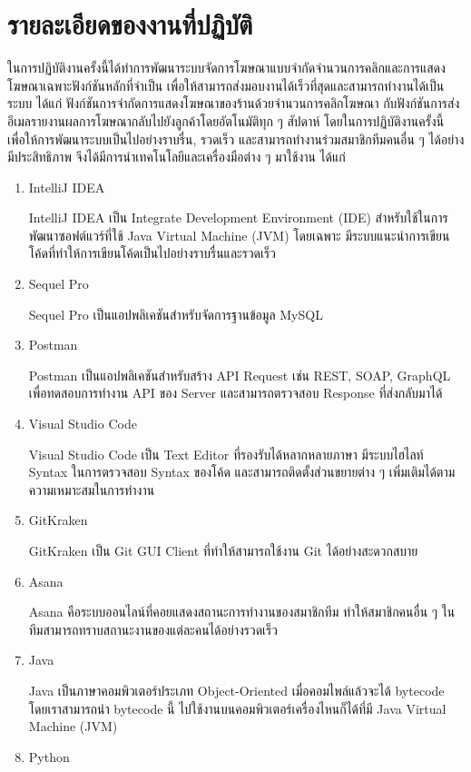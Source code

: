 \section{รายละเอียดของงานที่ปฏิบัติ}
ในการปฏิบัติงานครั้งนี้ได้ทำการพัฒนาระบบจัดการโฆษณาแบบจำกัดจำนวนการคลิกและการแสดงโฆษณาเฉพาะฟังก์ชันหลักที่จำเป็น เพื่อให้สามารถส่งมอบงานได้เร็วที่สุดและสามารถทำงานได้เป็นระบบ ได้แก่ ฟังก์ชันการจำกัดการแสดงโฆษณาของร้านด้วยจำนวนการคลิกโฆษณา กับฟังก์ชันการส่งอีเมลรายงานผลการโฆษณากลับไปยังลูกค้าโดยอัตโนมัติทุก ๆ สัปดาห์ โดยในการปฏิบัติงานครั้งนี้ เพื่อให้การพัฒนาระบบเป็นไปอย่างราบรื่น, รวดเร็ว และสามารถทำงานร่วมสมาชิกทีมคนอื่น ๆ ได้อย่างมีประสิทธิภาพ จึงได้มีการนำเทคโนโลยีและเครื่องมือต่าง ๆ มาใช้งาน ได้แก่
\begin{enumerate}
	\item IntelliJ IDEA
	
	IntelliJ IDEA เป็น Integrate Development Environment (IDE) สำหรับใช้ในการพัฒนาซอฟต์แวร์ที่ใช้ Java Virtual Machine (JVM) โดยเฉพาะ มีระบบแนะนำการเขียนโค้ดที่ทำให้การเขียนโค้ดเป็นไปอย่างราบรื่นและรวดเร็ว ~\cite{intellij}
	\item Sequel Pro
	
	Sequel Pro เป็นแอปพลิเคชันสำหรับจัดการฐานข้อมูล MySQL ~\cite{sequelpro}
	\item Postman
	
	Postman เป็นแอปพลิเคชันสำหรับสร้าง API Request เช่น REST, SOAP, GraphQL เพื่อทดสอบการทำงาน API ของ Server และสามารถตรวจสอบ Response ที่ส่งกลับมาได้ ~\cite{postman}
	\item Visual Studio Code
	
	Visual Studio Code เป็น Text Editor ที่รองรับได้หลากหลายภาษา มีระบบไฮไลท์ Syntax ในการตรวจสอบ Syntax ของโค้ด และสามารถติดตั้งส่วนขยายต่าง ๆ เพิ่มเติมได้ตามความเหมาะสมในการทำงาน ~\cite{vscode}
	\item GitKraken
	
	GitKraken เป็น Git GUI Client ที่ทำให้สามารถใช้งาน Git ได้อย่างสะดวกสบาย ~\cite{gitkraken}
	\item Asana
	
	Asana คือระบบออนไลน์ที่คอยแสดงสถานะการทำงานของสมาชิกทีม ทำให้สมาชิกคนอื่น ๆ ในทีมสามารถทราบสถานะงานของแต่ละคนได้อย่างรวดเร็ว ~\cite{asana}
	\item Java
	
	Java เป็นภาษาคอมพิวเตอร์ประเภท Object-Oriented เมื่อคอมไพล์แล้วจะได้ bytecode โดยเราสามารถนำ bytecode นี้ ไปใช้งานบนคอมพิวเตอร์เครื่องไหนก็ได้ที่มี Java Virtual Machine (JVM) ~\cite{java}
	\item Python
	

\end{enumerate}
